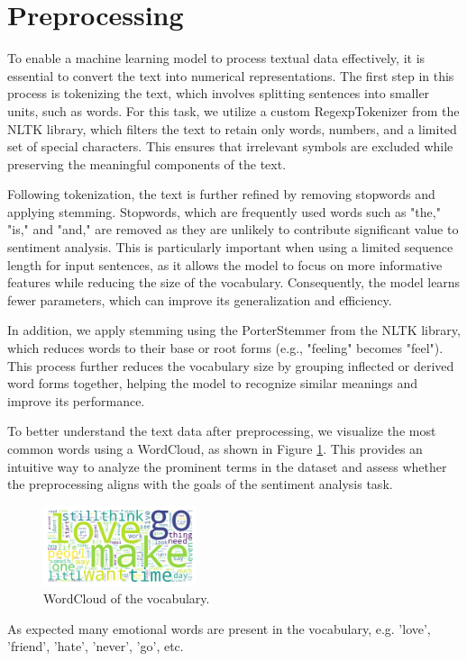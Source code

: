 \section{Preprocessing}
To enable a machine learning model to process textual data effectively, it is essential to convert the text into numerical representations. The first step in this process is tokenizing the text, which involves splitting sentences into smaller units, such as words. For this task, we utilize a custom RegexpTokenizer from the NLTK library, which filters the text to retain only words, numbers, and a limited set of special characters. This ensures that irrelevant symbols are excluded while preserving the meaningful components of the text.

Following tokenization, the text is further refined by removing stopwords and applying stemming. Stopwords, which are frequently used words such as "the," "is," and "and," are removed as they are unlikely to contribute significant value to sentiment analysis. This is particularly important when using a limited sequence length for input sentences, as it allows the model to focus on more informative features while reducing the size of the vocabulary. Consequently, the model learns fewer parameters, which can improve its generalization and efficiency.

In addition, we apply stemming using the PorterStemmer from the NLTK library, which reduces words to their base or root forms (e.g., "feeling" becomes "feel"). This process further reduces the vocabulary size by grouping inflected or derived word forms together, helping the model to recognize similar meanings and improve its performance.

To better understand the text data after preprocessing, we visualize the most common words using a WordCloud, as shown in Figure \ref{fig:wordcloud}. This provides an intuitive way to analyze the prominent terms in the dataset and assess whether the preprocessing aligns with the goals of the sentiment analysis task.
\begin{figure}[H]
    \vspace*{0.7cm}
    \centering
    \includegraphics[width=0.4\textwidth]{figures/wordcloud.png}
    \caption{WordCloud of the vocabulary.}
    \label{fig:wordcloud}
    \vspace*{0.7cm}
\end{figure}
As expected many emotional words are present in the vocabulary, e.g. 'love', 'friend', 'hate', 'never', 'go', etc.

